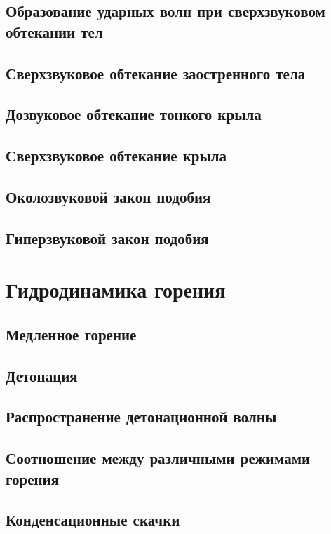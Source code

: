 \documentclass[12pt,a4paper]{book}
\begin{document}
\section{Образование ударных волн при сверхзвуковом обтекании тел}\label{sec:p122}
\section{Сверхзвуковое обтекание заостренного тела}\label{sec:p123}
\section{Дозвуковое обтекание тонкого крыла}\label{sec:p124}
\section{Сверхзвуковое обтекание крыла}\label{sec:p125}
\section{Околозвуковой закон подобия}\label{sec:p126}
\section{Гиперзвуковой закон подобия}\label{sec:p127}

\chapter{Гидродинамика горения}
\section{Медленное горение}\label{sec:p128}
\section{Детонация}\label{sec:p129}
\section{Распространение детонационной волны}\label{sec:p130}
\section{Соотношение между различными режимами горения}\label{sec:p131}
\section{Конденсационные скачки}\label{sec:p132}
\end{document}
